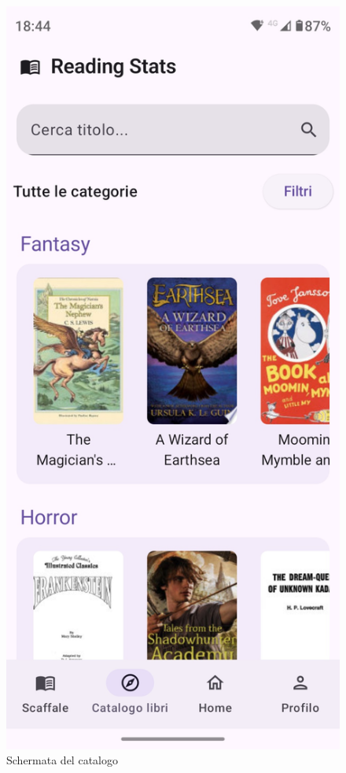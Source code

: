 \documentclass{article}
\begin{document}
\begin{figure}[H]
  \centering
  \includegraphics[width=0.6\linewidth]{catalog.png}
  \caption{Schermata del catalogo}
  \label{fig:sitemap}
\end{figure}
\end{document}
